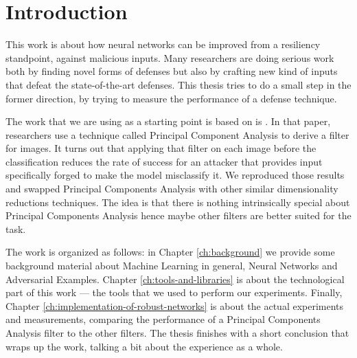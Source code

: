 \chapter*{Introduction}

This work is about how neural networks can be improved from a
resiliency standpoint, against malicious inputs. Many researchers are
doing serious work \cite{papernot2016cleverhans}
\cite{DBLP:journals/corr/KurakinGB16} \cite{carlini2017adversarial}
\cite{meng2017magnet} \cite{yuan2017adversarial} \cite{xu2017feature}
\cite{liao2018defense} both by finding novel forms of defenses but also
by crafting new kind of inputs that defeat the state-of-the-art
defenses. This thesis tries to do a small step in the former direction,
by trying to measure the performance of a defense technique.

The work that we are using as a starting point is based on is
\cite{bhagoji2018enhancing}. In that paper, researchers use a technique
called Principal Component Analysis to derive a filter for images. It
turns out that applying that filter on each image before the
classification reduces the rate of success for an attacker that
provides input specifically forged to make the model misclassify it. We
reproduced those results and swapped Principal Components Analysis with
other similar dimensionality reductions techniques. The idea is that
there is nothing intrinsically special about Principal Components
Analysis hence maybe other filters are better suited for the task.

The work is organized as follows: in Chapter \ref{ch:background} we
provide some background material about Machine Learning in general,
Neural Networks and Adversarial Examples. Chapter
\ref{ch:tools-and-libraries} is about the technological part of this
work --- the tools that we used to perform our experiments. Finally,
Chapter \ref{ch:implementation-of-robust-networks} is about the actual
experiments and measurements, comparing the performance of a Principal
Components Analysis filter to the other filters. The thesis finishes
with a short conclusion that wraps up the work, talking a bit about the
experience as a whole.
